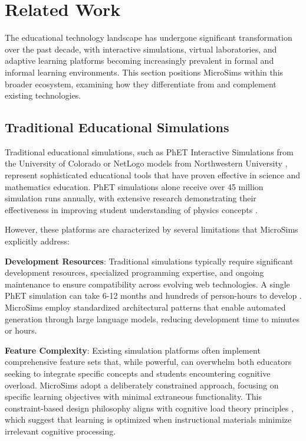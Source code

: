 \section{Related Work}
\label{sec:related}

The educational technology landscape has undergone significant transformation over the past decade, with interactive simulations, virtual laboratories, and adaptive learning platforms becoming increasingly prevalent in formal and informal learning environments. This section positions MicroSims within this broader ecosystem, examining how they differentiate from and complement existing technologies.

\subsection{Traditional Educational Simulations}

Traditional educational simulations, such as PhET Interactive Simulations from the University of Colorado \cite{wieman2008phet, phet2023} or NetLogo models from Northwestern University \cite{wilensky1999netlogo}, represent sophisticated educational tools that have proven effective in science and mathematics education. PhET simulations alone receive over 45 million simulation runs annually, with extensive research demonstrating their effectiveness in improving student understanding of physics concepts \cite{adams2008study, finkelstein2005phet}.

However, these platforms are characterized by several limitations that MicroSims explicitly address:

\textbf{Development Resources}: Traditional simulations typically require significant development resources, specialized programming expertise, and ongoing maintenance to ensure compatibility across evolving web technologies. A single PhET simulation can take 6-12 months and hundreds of person-hours to develop \cite{phet2023}. MicroSims employ standardized architectural patterns that enable automated generation through large language models, reducing development time to minutes or hours.

\textbf{Feature Complexity}: Existing simulation platforms often implement comprehensive feature sets that, while powerful, can overwhelm both educators seeking to integrate specific concepts and students encountering cognitive overload. MicroSims adopt a deliberately constrained approach, focusing on specific learning objectives with minimal extraneous functionality. This constraint-based design philosophy aligns with cognitive load theory principles \cite{sweller1988cognitive}, which suggest that learning is optimized when instructional materials minimize irrelevant cognitive processing.

